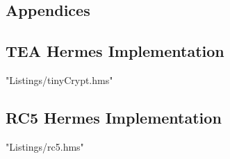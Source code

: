 \documentclass[a4paper,10pt,openright]{memoir}
\begin{document}
\clearpage
\newpage
\begin{appendices}
\renewcommand*{\lstlistingname}{Appendix}
\chapter{Appendices}
\section{TEA Hermes Implementation}
\label{code:TEA_Full_Imp}
 {"Listings/tinyCrypt.hms"}
\newpage
\section{RC5 Hermes Implementation}
\label{code:RC5_Full_Imp}
 {"Listings/rc5.hms"}

\end{appendices}
\end{document}
